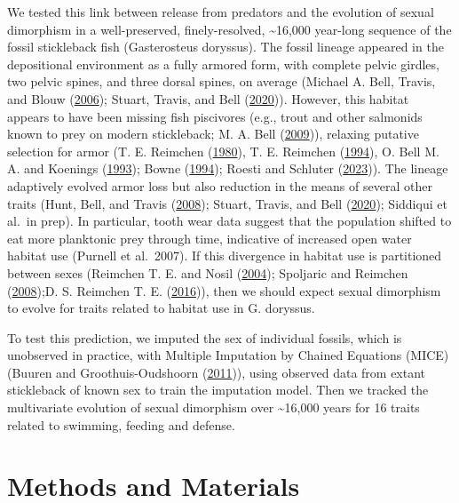 \documentclass[
  12pt,
]{article}
\begin{document}
We tested this link between release from predators and the evolution of
sexual dimorphism in a well-preserved, finely-resolved,
\textasciitilde16,000 year-long sequence of the fossil stickleback fish
(Gasterosteus doryssus). The fossil lineage appeared in the depositional
environment as a fully armored form, with complete pelvic girdles, two
pelvic spines, and three dorsal spines, on average (Michael A. Bell,
Travis, and Blouw (\protect\hyperlink{ref-Bell2006}{2006}); Stuart,
Travis, and Bell (\protect\hyperlink{ref-Stuart2020}{2020})). However,
this habitat appears to have been missing fish piscivores (e.g., trout
and other salmonids known to prey on modern stickleback; M. A. Bell
(\protect\hyperlink{ref-Bell2009}{2009})), relaxing putative selection
for armor (T. E. Reimchen (\protect\hyperlink{ref-Reimchen1980}{1980}),
T. E. Reimchen (\protect\hyperlink{ref-Reimchen1994}{1994}), O. Bell M.
A. and Koenings (\protect\hyperlink{ref-BellEtAl1993}{1993}); Bowne
(\protect\hyperlink{ref-Bowne1994}{1994}); Roesti and Schluter
(\protect\hyperlink{ref-Roestietal2023}{2023})). The lineage adaptively
evolved armor loss but also reduction in the means of several other
traits (Hunt, Bell, and Travis (\protect\hyperlink{ref-Hunt2008}{2008});
Stuart, Travis, and Bell (\protect\hyperlink{ref-Stuart2020}{2020});
Siddiqui et al.~in prep). In particular, tooth wear data suggest that
the population shifted to eat more planktonic prey through time,
indicative of increased open water habitat use (Purnell et al.~2007). If
this divergence in habitat use is partitioned between sexes (Reimchen T.
E. and Nosil (\protect\hyperlink{ref-ReimchenNosil2004}{2004});
Spoljaric and Reimchen
(\protect\hyperlink{ref-SpoljaricReimchen2008}{2008});D. S. Reimchen T.
E. (\protect\hyperlink{ref-Reimchen2016}{2016})), then we should expect
sexual dimorphism to evolve for traits related to habitat use in G.
doryssus.

To test this prediction, we imputed the sex of individual fossils, which
is unobserved in practice, with Multiple Imputation by Chained Equations
(MICE) (Buuren and Groothuis-Oudshoorn
(\protect\hyperlink{ref-MICE}{2011})), using observed data from extant
stickleback of known sex to train the imputation model. Then we tracked
the multivariate evolution of sexual dimorphism over
\textasciitilde16,000 years for 16 traits related to swimming, feeding
and defense.

\hypertarget{methods-and-materials}{%
\section{Methods and Materials}\label{methods-and-materials}}
\end{document}
